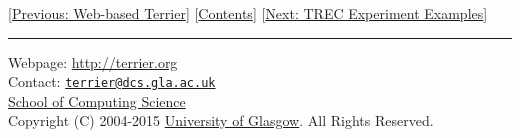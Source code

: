 {[}\href{terrier_http.html}{Previous: Web-based Terrier}{]}
{[}\href{index.html}{Contents}{]} {[}\href{trec_examples.html}{Next:
TREC Experiment Examples}{]}

\begin{center}\rule{0.5\linewidth}{\linethickness}\end{center}

Webpage: \url{http://terrier.org}\\
Contact:
\href{mailto:terrier@dcs.gla.ac.uk}{\nolinkurl{terrier@dcs.gla.ac.uk}}\\
\href{http://www.dcs.gla.ac.uk/}{School of Computing Science}\\
Copyright (C) 2004-2015 \href{http://www.gla.ac.uk/}{University of
Glasgow}. All Rights Reserved.

~
